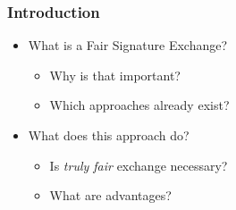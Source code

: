 \begin{frame}
	\frametitle{Introduction}

	\begin{itemize}
		\setlength\itemsep{1em}
		\item<1-> What is a Fair Signature Exchange?
			\begin{itemize}
				\item<2-> Why is that important?
				\item<3-> Which approaches already exist?
			\end{itemize}
		\item<4-> What does this approach do?
			\begin{itemize}
				\item<5-> Is \textit{truly fair} exchange necessary?
				\item<6-> What are advantages?
			\end{itemize}
	\end{itemize}
\end{frame}